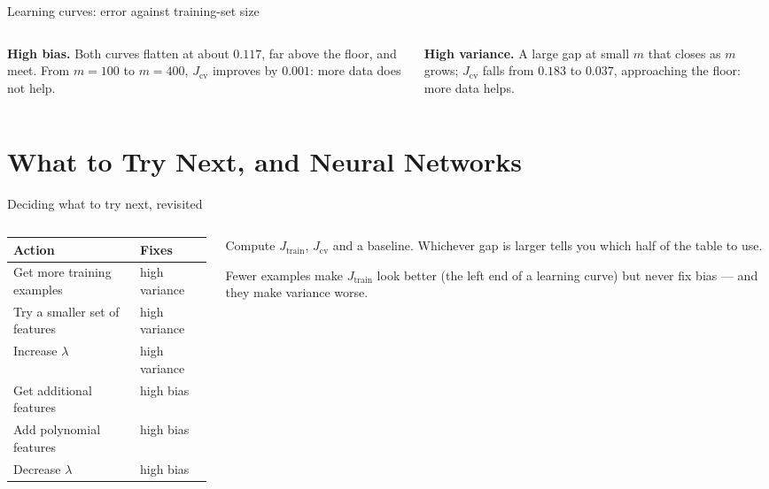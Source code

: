 \documentclass[aspectratio=169,10pt]{beamer}
\begin{document}
\begin{frame}{Learning curves: error against training-set size}
  \begin{columns}[T,onlytextwidth]
    \begin{column}{0.5\textwidth}
      \textbf{High bias.} Both curves flatten at about $0.117$, far above the floor, and
      meet. From $m=100$ to $m=400$, $J_{\text{cv}}$ improves by $0.001$:
      \alert{more data does not help}.
    \end{column}
    \begin{column}{0.46\textwidth}
      \textbf{High variance.} A large gap at small $m$ that closes as $m$ grows;
      $J_{\text{cv}}$ falls from $0.183$ to $0.037$, approaching the floor:
      \alert{more data helps}.
    \end{column}
  \end{columns}
\end{frame}

\section{What to Try Next, and Neural Networks}

\begin{frame}{Deciding what to try next, revisited}
  \begin{columns}[T,onlytextwidth]
    \begin{column}{0.55\textwidth}
      \footnotesize
      \renewcommand{\arraystretch}{1.3}
      \begin{tabular}{@{}L{4.2cm}L{3.4cm}@{}}
        \toprule
        Action & Fixes\\
        \midrule
        Get more training examples & high variance\\
        Try a smaller set of features & high variance\\
        Increase $\lambda$ & high variance\\
        \midrule
        Get additional features & high bias\\
        Add polynomial features & high bias\\
        Decrease $\lambda$ & high bias\\
        \bottomrule
      \end{tabular}
    \end{column}
    \begin{column}{0.41\textwidth}\raggedright
      \begin{keyidea}\raggedright
        Compute $J_{\text{train}}$, $J_{\text{cv}}$ and a baseline. Whichever gap is larger
        tells you which half of the table to use.
      \end{keyidea}
      \begin{pitfall}
        \footnotesize\raggedright Fewer examples make $J_{\text{train}}$ look better (the left end of
        a learning curve) but never fix bias --- and they make variance worse.
      \end{pitfall}
    \end{column}
  \end{columns}
\end{frame}
\end{document}
